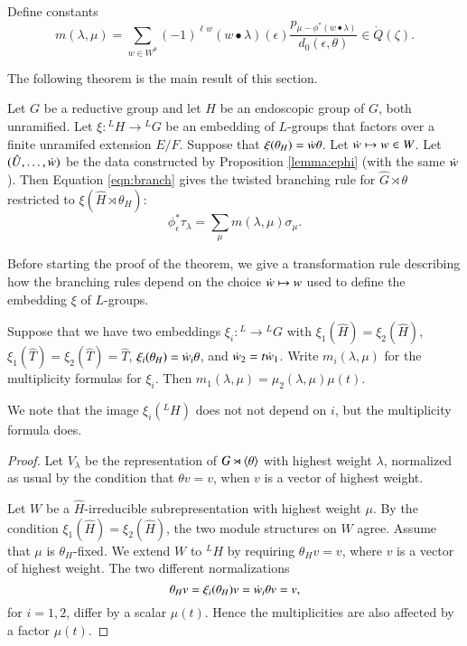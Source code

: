 Define constants 
\begin{equation}\label{eqn:branch}
m(\lambda,\mu) = \sum_{w\in W^\theta} 
(-1)^{\ell w} ({w\bullet\lambda})(\epsilon)
\frac{p_{\mu-\phi^*(w\bullet\lambda)}}{d_0(\epsilon,\theta)} \in \ring{Q}(\zeta).
\end{equation}

The following theorem is the main result of this section.

\begin{theorem}\label{thm:branch}
  Let $G$ be a reductive group and let $H$ be an endoscopic group of
  $G$, both unramified.  Let $\xi:{}^LH\to {}^LG$ be an embedding of
  $L$-groups that factors over a finite unramifed extension $E/F$.
  Suppose that $\xi(\theta_H) = \dot w\theta$.  Let $\dot w\mapsto w\in W$.
  Let $(\hat U,\ldots,\dot w)$ be the data constructed by
  Proposition \ref{lemma:ephi} (with the same $\dot w$).  
  Then Equation \ref{eqn:branch} gives
  the twisted branching rule for $\hat G\rtimes \theta$ restricted to
  $\xi(\hat H\rtimes \theta_H)$:
\[
\phi^*_\epsilon\tau_\lambda = \sum_\mu m(\lambda,\mu) \sigma_\mu.
\]
\end{theorem}

Before starting the proof of the theorem, we give a transformation rule
describing how the branching
rules depend on the choice $\dot w\mapsto w$ 
used to define the embedding $\xi$ of $L$-groups.  


\begin{lemma}\label{lemma:transform}
Suppose that we have two embeddings $\xi_i:{}^L\to {}^LG$ with
$\xi_1(\hat H) =\xi_2(\hat H)$, $\xi_1(\hat T) = \xi_2(\hat T) = \hat T$, 
$\xi_i(\theta_H) = \dot w_i\theta$, and $\dot w_2 = t\dot w_1$.
Write $m_i(\lambda,\mu)$ for the multiplicity formulas for $\xi_i$.
Then $m_1(\lambda,\mu) = \mu_2(\lambda,\mu)\mu(t)$.
\end{lemma}

We note that the image $\xi_i({}^LH)$ does not not depend on 
$i$, but the multiplicity formula does.

\begin{proof}  
Let $V_\lambda$ be the representation of $G\rtimes \langle{\theta}\rangle$ with
highest weight $\lambda$, normalized as usual by the condition that $\theta v=v$,
when $v$ is a vector of highest weight.

Let $W$ be a $\hat H$-irreducible subrepresentation with highest
weight $\mu$.  By the condition $\xi_1(\hat H) =\xi_2(\hat H)$, the
two module structures on $W$ agree.  Assume that $\mu$ is
$\theta_H$-fixed.  We extend $W$ to ${}^LH$ by requiring $\theta_H v =
v$, where $v$ is a vector of highest weight.  The two
different normalizations
\[
\theta_H v = \xi_i(\theta_H) v = \dot w_i \theta v =v,
\]
for $i=1,2$, 
differ by a scalar $\mu(t)$.  
Hence the multiplicities are also affected by a factor $\mu(t)$.
\end{proof}

